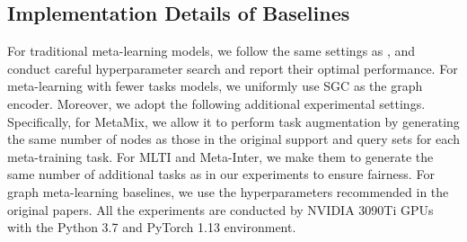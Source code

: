 
\subsection{Implementation Details of Baselines}
For traditional meta-learning models, we follow the same settings as \cite{ding2020graph, liu2022few}, and conduct careful hyperparameter search and report their optimal performance. For meta-learning with fewer tasks models, we uniformly use SGC as the graph encoder. Moreover, we adopt the following additional experimental settings. Specifically, for MetaMix, we allow it to perform task augmentation by generating the same number of nodes as those in the original support and query sets for each meta-training task. For MLTI and Meta-Inter, we make them to generate the same number of additional tasks as in our experiments to ensure fairness. For graph meta-learning baselines, we use the hyperparameters recommended in the original papers. All the experiments are conducted by NVIDIA 3090Ti GPUs with the Python 3.7 and PyTorch 1.13 environment.

